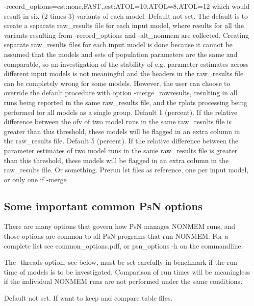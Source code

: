 \begin{optionlist}
-record\_options=est:none,FAST,,est:ATOL=10,ATOL=8,ATOL=12 
which would result in six (2 times 3) variants of each model.
\nextopt
{}
Default not set. The default is to create a separate raw\_results file for each input model,
where results for all the variants resulting from -record\_options and -alt\_nonmem
are collected. Creating separate raw\_results files for each input model is done because
it cannot be assumed that the models and sets of population parameters are the same and comparable,
so an investigation of the stability of e.g. parameter estimates across different input models
is not meaningful and the headers in the raw\_results file can be completely wrong for some models. 
However, the user can choose to override the default procedure
with option -merge\_rawresults, resulting in all runs being reported in the same raw\_results file,
and the rplots processing being performed for all models as a single group.
\nextopt
{}
Default 1 (percent). If the relative difference between the ofv of two model runs in the same raw\_results file
is greater than this threshold, these models will be flagged in an extra column in the raw\_results file.
\nextopt
{}
Default 5 (percent). If the relative difference between the parameter estimates of two model runs 
in the same raw\_results file
is greater than this threshold, these models will be flagged in an extra column in the raw\_results file.
\nextopt
{}
Or something. Prerun lst files as reference, one per input model, or only one if -merge
\nextopt
\end{optionlist}

\subsection{Some important common PsN options}
There are many options that govern how PsN manages NONMEM runs, and
those options are common to all PsN programs that run NONMEM.
For a complete list see common\_options.pdf, 
or psn\_options -h on the commandline.

The -threads option, see below, must be set carefully in benchmark if the run time
of models is to be investigated. Comparison of run times will be meaningless
if the individual NONMEM runs are not performed under the same conditions.

\begin{optionlist}
Default not set. If want to keep and compare table files.
\end{optionlist}

